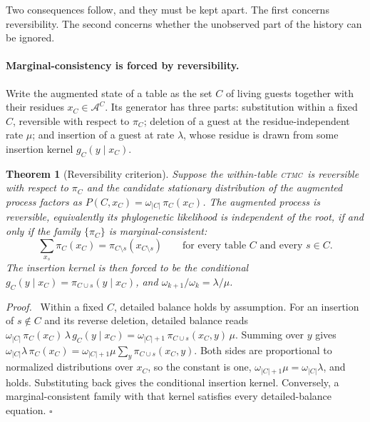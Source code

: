 \documentclass[11pt]{article}
\newtheorem{thm}{Theorem}
\newenvironment{proof}{\par\noindent\textit{Proof.}\ }{\hfill$\square$\par}
\newcommand{\CTMC}{\textsc{ctmc}}
\newcommand{\Xset}{\mathcal{A}}
\newcommand{\eqm}{\pi}
\begin{document}
Two consequences follow, and they must be kept apart. The first concerns
reversibility. The second concerns whether the unobserved part of the
history can be ignored.

\paragraph{Marginal-consistency is forced by reversibility.} Write the
augmented state of a table as the set $C$ of living guests together with
their residues $x_C\in\Xset^{C}$. Its generator has three parts: substitution
within a fixed $C$, reversible with respect to $\eqm_C$; deletion of a guest
at the residue-independent rate $\mu$; and insertion of a guest at rate
$\lambda$, whose residue is drawn from some insertion kernel
$g_C(y\mid x_C)$.

\begin{thm}[Reversibility criterion]
\label{thm:revcond}
Suppose the within-table \CTMC\ is reversible with respect to $\eqm_C$ and
the candidate stationary distribution of the augmented process factors as
$P(C,x_C)=\omega_{|C|}\,\eqm_C(x_C)$. The augmented process is reversible,
equivalently its phylogenetic likelihood is independent of the root, if and
only if the family $\{\eqm_C\}$ is \emph{marginal-consistent}:
\begin{equation}
\label{eq:consistency}
\sum_{x_s}\eqm_C(x_C)=\eqm_{C\setminus s}(x_{C\setminus s})
\qquad\text{for every table } C \text{ and every } s\in C .
\end{equation}
The insertion kernel is then forced to be the conditional
$g_C(y\mid x_C)=\eqm_{C\cup s}(y\mid x_C)$, and
$\omega_{k+1}/\omega_k=\lambda/\mu$.
\end{thm}

\begin{proof}
Within a fixed $C$, detailed balance holds by assumption. For an insertion
of $s\notin C$ and its reverse deletion, detailed balance reads
$\omega_{|C|}\,\eqm_C(x_C)\,\lambda\,g_C(y\mid x_C)=\omega_{|C|+1}\,\eqm_{C\cup s}(x_C,y)\,\mu$.
Summing over $y$ gives
$\omega_{|C|}\lambda\,\eqm_C(x_C)=\omega_{|C|+1}\mu\sum_y\eqm_{C\cup s}(x_C,y)$.
Both sides are proportional to normalized distributions over $x_C$, so the
constant is one, $\omega_{|C|+1}\mu=\omega_{|C|}\lambda$, and
 holds. Substituting back gives the conditional
insertion kernel. Conversely, a marginal-consistent family with that kernel
satisfies every detailed-balance equation.
\end{proof}
\end{document}
